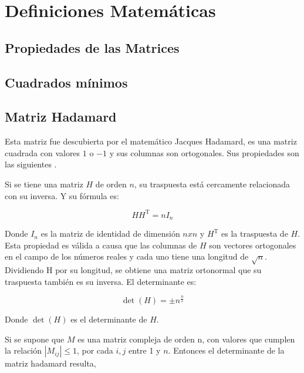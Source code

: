 
\chapter{Definiciones Matemáticas} %

\label{AppendixB} %


\section{Propiedades de las Matrices}

\section{Cuadrados mínimos}

\section{Matriz Hadamard}
Esta matriz fue descubierta por el matemático Jacques Hadamard, es una matriz cuadrada con valores $1$ o $-1$ y sus columnas 
son ortogonales. Sus propiedades son las siguientes \cite{HadamardWiki}. 

Si se tiene una matriz $H$ de orden $n$, su traspuesta está cercamente relacionada con su inversa. Y su fórmula es:

$$ H H^{\mathrm{T}} = n I_n $$

Donde $I_n$ es la matriz de identidad de dimensión $n x n$ y $H^\mathrm{T}$ es la traspuesta de $H$. Esta propiedad es válida a causa 
que las columnas de $H$ son vectores ortogonales en el campo de los números reales y cada uno tiene una longitud de $\sqrt n$.
Dividiendo H por su longitud, se obtiene una matriz ortonormal que su traspuesta también es su inversa. El determinante es:

$$ \operatorname{det}(H) = \pm n^{\frac{n}{2}} $$

Donde $\operatorname{det}(H)$ es el determinante de $H$.

Si se supone que $M$ es una matriz compleja de orden n, con valores que cumplen la relación $|M_{ij}| \le 1$, por cada $i,j$ 
entre 1 y $n$. Entonces el determinante de la matriz hadamard resulta,
		    
